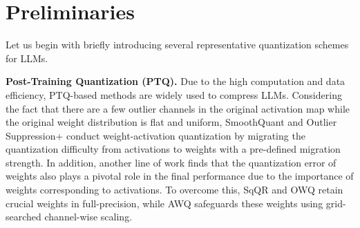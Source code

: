 \documentclass{article} %
\begin{document}

\iffalse
\section{Preliminaries}
Let us begin with briefly introducing several representative quantization schemes for LLMs.

\textbf{Post-Training Quantization (PTQ).} Due to the high computation and data efficiency, PTQ-based methods are widely used to compress LLMs. Considering the fact that there are a few outlier channels in the original activation map while the original weight distribution is flat and uniform, SmoothQuant \citep{smoothquant} and Outlier Suppression+ \citep{outlier-plus} conduct weight-activation quantization by migrating the quantization difficulty from activations to weights with a pre-defined migration strength. In addition, another line of work finds that the quantization error of weights also plays a pivotal role in the final performance due to the importance of weights corresponding to activations. To overcome this, SqQR \citep{spqr} and OWQ \citep{owq} retain crucial weights in full-precision, while AWQ \citep{awq} safeguards these weights using grid-searched channel-wise scaling.
\end{document}
